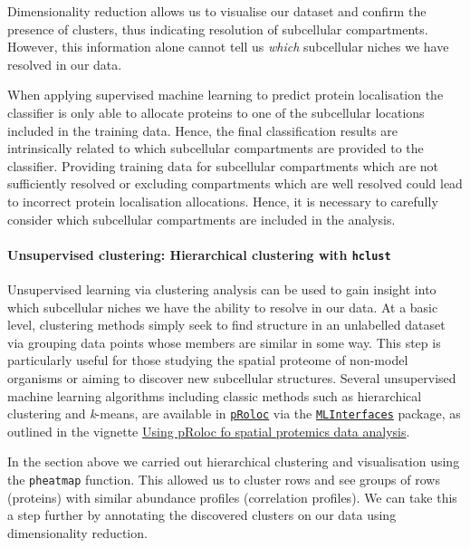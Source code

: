 \documentclass[9pt,a4paper,]{extarticle}
\begin{document}
Dimensionality reduction allows us to visualise our dataset and confirm the
presence of clusters, thus indicating resolution of subcellular compartments.
However, this information alone cannot tell us \emph{which} subcellular niches we
have resolved in our data.

When applying supervised machine learning to predict protein localisation
the classifier is only able to allocate proteins to one of the subcellular
locations included in the training data. Hence, the final classification results
are intrinsically related to which subcellular compartments are provided to the
classifier. Providing training data for subcellular compartments which are not
sufficiently resolved or excluding compartments which are well resolved could
lead to incorrect protein localisation allocations. Hence, it is necessary to
carefully consider which subcellular compartments are included in the analysis.

\paragraph{\texorpdfstring{Unsupervised clustering: Hierarchical clustering with \texttt{hclust}}{Unsupervised clustering: Hierarchical clustering with hclust}}\label{unsupervised-clustering-hierarchical-clustering-with-hclust}

Unsupervised learning via clustering analysis can be used to gain
insight into which subcellular niches we have the ability to resolve in our
data. At a basic level, clustering methods simply seek to find structure in an
unlabelled dataset via grouping data points whose members are similar in some way.
This step is particularly useful for those studying the spatial proteome of
non-model organisms or aiming to discover new subcellular structures. Several
unsupervised machine learning algorithms including classic methods such as
hierarchical clustering and \emph{k}-means, are available
in \href{https://www.bioconductor.org/packages/release/bioc/html/pRoloc.html}{\texttt{pRoloc}}
via the \href{https://www.bioconductor.org/packages/release/bioc/html/MLInterfaces.html}{\texttt{MLInterfaces}}
package, as outlined in the vignette \href{https://bioconductor.org/packages/3.20/bioc/vignettes/pRoloc/inst/doc/v01-pRoloc-tutorial.html\#51_Unsupervised_ML}{Using pRoloc fo spatial protemics data analysis}.

In the section above we carried out hierarchical clustering and visualisation
using the \texttt{pheatmap} function. This allowed us to cluster rows and see groups
of rows (proteins) with similar abundance profiles (correlation profiles). We
can take this a step further by annotating the discovered clusters on our data
using dimensionality reduction.
\end{document}
